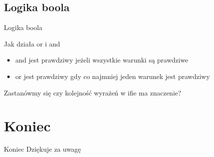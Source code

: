 \documentclass[polish]{beamer}
\begin{document}

\subsection{Logika boola}
\begin{frame}{Logika boola}
  \begin{block}{Jak działa or i and}
    \begin{itemize}
      \item and jest prawdziwy jeżeli wszystkie warunki są prawdziwe
      \item or jest prawdziwy gdy co najmniej jeden warunek jest prawdziwy
    \end{itemize}
  \end{block}
Zastanówmy się czy kolejność wyrażeń w ifie ma znaczenie?



\end{frame}




\section{Koniec}
\begin{frame}{Koniec}
  Dziękuje za uwagę
\end{frame}
\end{document}
